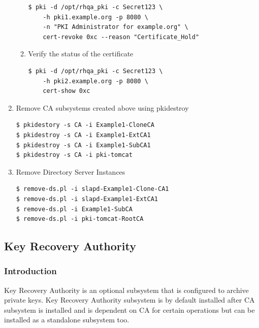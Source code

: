 \documentclass[12pt]{report}
\begin{document}
\begin{enumerate}[label*=\arabic*.]
\begin{enumerate}[label*=\arabic*.]
\begin{lstlisting}[style=bashInputStyle]
$ pki -d /opt/rhqa_pki -c Secret123 \
    -h pki1.example.org -p 8080 \
    -n "PKI Administrator for example.org" \
    cert-revoke 0xc --reason "Certificate_Hold"
                    \end{lstlisting}
            \item Verify the status of the certificate
                \begin{lstlisting}[style=bashInputStyle]
$ pki -d /opt/rhqa_pki -c Secret123 \
    -h pki2.example.org -p 8080 \
    cert-show 0xc
                \end{lstlisting}
        \end{enumerate}
        \item Remove CA subsystems created above using pkidestroy 
            \begin{lstlisting}[style=bashInputStyle]
$ pkidestory -s CA -i Example1-CloneCA
$ pkidestroy -s CA -i Example1-ExtCA1 
$ pkidestroy -s CA -i Example1-SubCA1
$ pkidestroy -s CA -i pki-tomcat
            \end{lstlisting}
        \item Remove Directory Server Instances 
            \begin{lstlisting}[style=bashInputStyle]
$ remove-ds.pl -i slapd-Example1-Clone-CA1
$ remove-ds.pl -i slapd-Example1-ExtCA1
$ remove-ds.pl -i Example1-SubCA
$ remove-ds.pl -i pki-tomcat-RootCA
            \end{lstlisting}
    \end{enumerate}
\subsection{Key Recovery Authority}
\subsubsection{Introduction}
Key Recovery Authority is an optional subsystem that is configured to archive private keys. Key Recovery Authority
subsystem is by default installed after CA subsystem is installed and is dependent on CA for certain operations
but can be installed as a standalone subsystem too.
\end{document}
